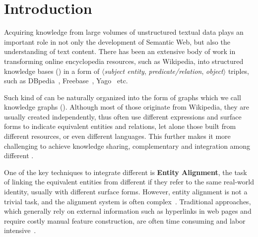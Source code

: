 	
	\section{Introduction}
	\label{section:intro}
    Acquiring knowledge from large volumes of unstructured textual data plays an important role in not only the development of Semantic
    Web, but also the understanding of text content. There has been an extensive body of work in transforming online encyclopedia resources, such as
    Wikipedia, into structured knowledge bases (\KBs) in a form of $\langle$\emph{subject entity},
   \emph{ predicate/relation}, \emph{object}$\rangle$ triples, such as DBpedia~\cite{Lehmann2009DBpedia,Auer2007DBpedia},
    Freebase~\cite{Bollacker2007Freebase}, Yago~\cite{Suchanek2008YAGO} etc.
    	


	Such kind of \KBs can be naturally organized into the form of graphs which we call knowledge graphs (\KGs). Although most of those \KGs
originate from Wikipedia, they are usually created independently, thus often use different expressions and surface forms to indicate
equivalent entities and relations, let alone those built from different resources, or even different languages. This further makes it more
challenging to achieve knowledge sharing, complementary and integration among different \KGs.
	
	One of the key techniques to integrate different \KGs is \textbf{Entity Alignment}, the task of linking the equivalent entities from
different \KGs if they refer to the same real-world identity, usually with different surface forms. However, entity alignment is not a
trivial task, and the alignment system is often complex~\cite{gokhale2014corleone,scharffe2014ontology}. Traditional approaches, which
generally rely on external information such as hyperlinks in web pages and require costly manual feature construction, are often time
consuming and labor intensive~\cite{zhu2017iterative}.
	
